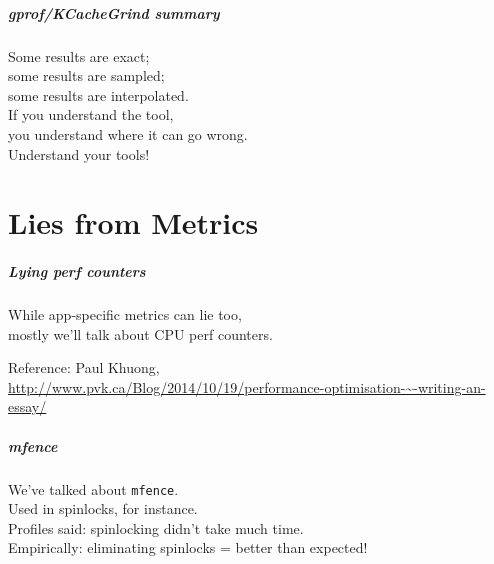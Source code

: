 \begin{frame}
  \frametitle{gprof/KCacheGrind summary}
  
    Some results are exact;\\
    some results are sampled;\\
    some results are interpolated.\\[1em]

    If you understand the tool, \\
    you understand where it can go wrong.\\[1em]

    Understand your tools!
  
\end{frame}

\part{Lies from Metrics}

\begin{frame}
  \partpage
\end{frame}

\begin{frame}
  \frametitle{Lying perf counters}
  
  
    While app-specific metrics can lie too,\\
    mostly we'll talk about CPU perf counters.
  

  \begin{center}
    Reference: Paul Khuong,\\
  \tiny
  \url{http://www.pvk.ca/Blog/2014/10/19/performance-optimisation-~-writing-an-essay/}

  \end{center}

\end{frame}

\begin{frame}
  \frametitle{mfence}


    We've talked about {\tt mfence}.\\
    Used in spinlocks, for instance.\\[2em]
    Profiles said: spinlocking didn't take much time.\\
    Empirically: eliminating spinlocks = better than expected!
    
  
  
\end{frame}

